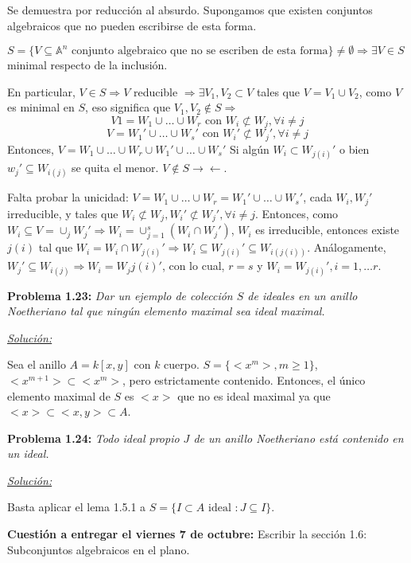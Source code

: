 \begin{Dem}
Se demuestra por reducción al absurdo. Supongamos que existen conjuntos algebraicos que no pueden escribirse de esta forma. 

$S= \{ V \subseteq \mathbb{A}^n \text{ conjunto algebraico que no se escriben de esta forma} \} \neq \emptyset \Rightarrow \exists V\in S$ minimal respecto de la inclusión.

En particular, $V\in S \Rightarrow V$ reducible $\Rightarrow \exists V_1 , V_2 \subset V$ tales que $V=V_1\cup V_2$, como $V$ es minimal en $S$, eso significa que $V_1,V_2 \notin S \Rightarrow$ 
$$V1=W_1\cup \dots \cup W_r \text{ con } W_i\not \subset W_j, \forall i \neq j$$
$$V=W_1'\cup \dots \cup W_s' \text{ con } W_i'\not \subset W_j', \forall i \neq j$$
Entonces, $V=W_1\cup \dots \cup W_r \cup W_1'\cup \dots \cup W_s'$
Si algún $W_i\subset W_{j(i)}'$ o bien $w_j'\subseteq W_{i(j)}$ se quita el menor. $V\notin S \rightarrow \leftarrow $.

Falta probar la unicidad: $V=W_1\cup \dots \cup W_r =W_1'\cup \dots \cup W_s'$, cada $W_i,W_j'$ irreducible, y tales que $W_i\not \subset W_j, W_i' \not \subset W_j', \forall i \neq j$.  Entonces, como $W_i \subseteq V= \cup_j W_j' \Rightarrow W_i=\cup_{j=1}^s(W_i\cap W_j')$, $W_i$ es irreducible, entonces existe $j(i)$ tal que $W_i=W_i\cap W_{j(i)}' \Rightarrow W_i \subseteq W_{j(i)}'\subseteq W_{i(j(i))}$. Análogamente, $W_j'\subseteq W_{i(j)} \Rightarrow W_i=W_j{j(i)}'$, con lo cual, $r=s$ y $W_i=W_{j(i)}', i=1,\dots r$.
\end{Dem}

\textbf{Problema 1.23: } \textit{Dar un ejemplo de colección $S$ de ideales en un anillo Noetheriano tal que ningún elemento maximal sea ideal maximal.}

\underline{\textit{Solución: }}

Sea el anillo $A=k[x,y]$ con $k$ cuerpo. $S= \{ <x^m >, m\ge 1 \}$, $<x^{m+1}>\subset <x^m>$, pero estrictamente contenido. Entonces, el único elemento maximal de $S$ es $<x>$ que no es ideal maximal ya que $<x>\subset <x,y> \subset A$.

\textbf{Problema 1.24: } \textit{ Todo ideal propio $J$ de un anillo Noetheriano está contenido en un ideal.}

\underline{\textit{Solución: }}

Basta aplicar el lema 1.5.1 a $S=\{ I \subset A \text{ ideal } : J\subseteq I \} $.

\textbf{Cuestión a entregar el viernes 7 de octubre:} Escribir la sección 1.6: Subconjuntos algebraicos en el plano.


